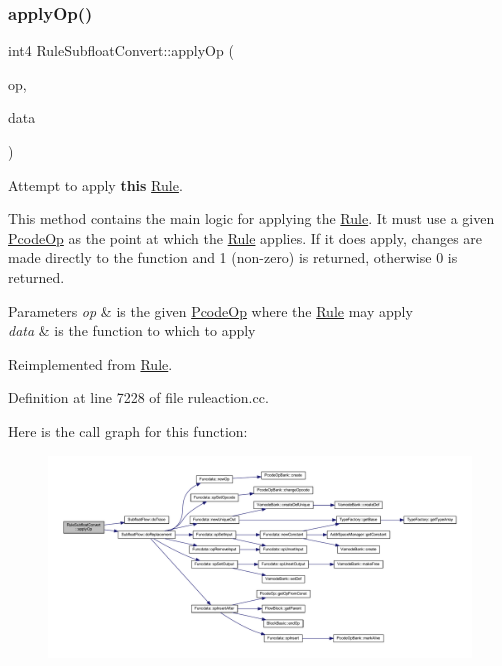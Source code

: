 \subsubsection{\texorpdfstring{applyOp()}{applyOp()}}
{\footnotesize\ttfamily int4 Rule\+Subfloat\+Convert\+::apply\+Op (\begin{DoxyParamCaption}\item[{\mbox{\hyperlink{class_pcode_op}{Pcode\+Op}} $\ast$}]{op,  }\item[{\mbox{\hyperlink{class_funcdata}{Funcdata}} \&}]{data }\end{DoxyParamCaption})\hspace{0.3cm}{\ttfamily [virtual]}}



Attempt to apply {\bfseries{this}} \mbox{\hyperlink{class_rule}{Rule}}. 

This method contains the main logic for applying the \mbox{\hyperlink{class_rule}{Rule}}. It must use a given \mbox{\hyperlink{class_pcode_op}{Pcode\+Op}} as the point at which the \mbox{\hyperlink{class_rule}{Rule}} applies. If it does apply, changes are made directly to the function and 1 (non-\/zero) is returned, otherwise 0 is returned. 
\begin{DoxyParams}{Parameters}
{\em op} & is the given \mbox{\hyperlink{class_pcode_op}{Pcode\+Op}} where the \mbox{\hyperlink{class_rule}{Rule}} may apply \\
\hline
{\em data} & is the function to which to apply \\
\hline
\end{DoxyParams}


Reimplemented from \mbox{\hyperlink{class_rule_a4e3e61f066670175009f60fb9dc60848}{Rule}}.



Definition at line 7228 of file ruleaction.\+cc.

Here is the call graph for this function\+:
\nopagebreak
\begin{figure}[H]
\begin{center}
\leavevmode
\includegraphics[width=350pt]{class_rule_subfloat_convert_a53fecdf028f4d41f37ff015677d7731d_cgraph}
\end{center}
\end{figure}
\mbox{\label{class_rule_subfloat_convert_a017d2e6711abb9521250a93a85938856}} 
